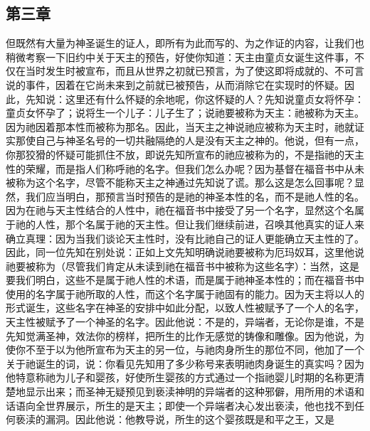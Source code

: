 
\subsection{第三章}

\par

但既然有大量为神圣诞生的证人，即所有为此而写的、为之作证的内容，让我们也稍微考察一下旧约中关于天主的预告，好使你知道：天主由童贞女诞生这件事，不仅在当时发生时被宣布，而且从世界之初就已预言，为了使这即将成就的、不可言说的事件，因着在它尚未来到之前就已被预告，从而消除它在实现时的怀疑。因此，先知说：这里还有什么怀疑的余地呢，你这怀疑的人？先知说童贞女将怀孕：童贞女怀孕了；说将生一个儿子：儿子生了；说祂要被称为天主：祂被称为天主。因为祂因着那本性而被称为那名。因此，当天主之神说祂应被称为天主时，祂就证实那使自己与神圣名号的一切共融隔绝的人是没有天主之神的。他说，但有一点，你那狡猾的怀疑可能抓住不放，即说先知所宣布的祂应被称为的，不是指祂的天主性的荣耀，而是指人们称呼祂的名字。但我们怎么办呢？因为基督在福音书中从未被称为这个名字，尽管不能称天主之神通过先知说了谎。那么这是怎么回事呢？显然，我们应当明白，那预言当时预告的是祂的神圣本性的名，而不是祂人性的名。因为在祂与天主性结合的人性中，祂在福音书中接受了另一个名字，显然这个名属于祂的人性，那个名属于祂的天主性。但让我们继续前进，召唤其他真实的证人来确立真理：因为当我们谈论天主性时，没有比祂自己的证人更能确立天主性的了。因此，同一位先知在别处说：正如上文先知明确说祂要被称为厄玛奴耳，这里他说祂要被称为（尽管我们肯定从未读到祂在福音书中被称为这些名字）：当然，这是要我们明白，这些不是属于祂人性的术语，而是属于祂神圣本性的；而在福音书中使用的名字属于祂所取的人性，而这个名字属于祂固有的能力。因为天主将以人的形式诞生，这些名字在神圣的安排中如此分配，以致人性被赋予了一个人的名字，天主性被赋予了一个神圣的名字。因此他说：不是的，异端者，无论你是谁，不是先知觉满圣神，效法你的榜样，把所生的比作无感觉的铸像和雕像。因为他说，为使你不至于以为他所宣布为天主的另一位，与祂肉身所生的那位不同，他加了一个关于祂诞生的词，说：你看见先知用了多少称号来表明祂肉身诞生的真实吗？因为他特意称祂为儿子和婴孩，好使所生婴孩的方式通过一个指祂婴儿时期的名称更清楚地显示出来；而圣神无疑预见到亵渎神明的异端者的这种邪僻，用所用的术语和话语向全世界展示，所生的是天主；即使一个异端者决心发出亵渎，他也找不到任何亵渎的漏洞。因此他说：他教导说，所生的这个婴孩既是和平之王，又是